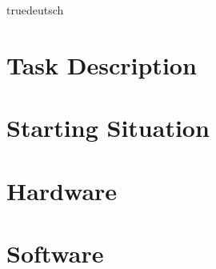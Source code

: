 \documentclass[a4paper,fleqn,german]{book}
\begin{document}

\zusammenfassung%
{truedeutsch} %
{} %
{} %






\mainmatter%
\pagestyle{fancy}%


\chapter{Task Description}%
%
%
\chapter{Starting Situation}%
%
%
\chapter{Hardware}%
%
%
\chapter{Software}%
%
%
\end{document}
